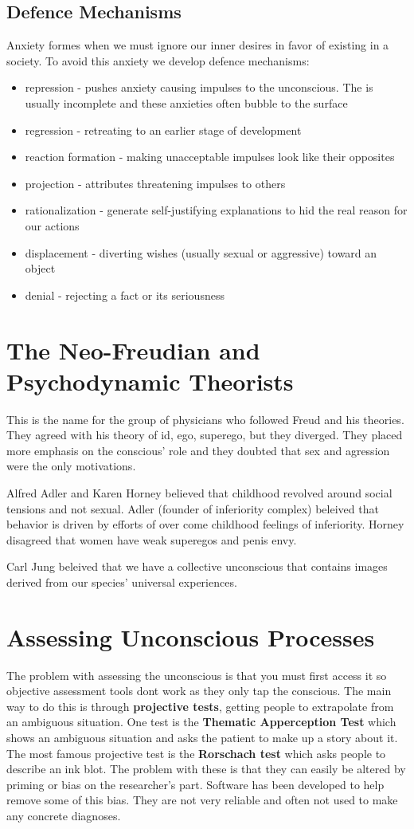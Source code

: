 \documentclass[12pt]{article}
\begin{document}
\subsection*{Defence Mechanisms}
Anxiety formes when we must ignore our inner desires in favor of existing in a society. To avoid this anxiety we develop defence mechanisms:
\begin{itemize}
\item repression - pushes anxiety causing impulses to the unconscious. The is usually incomplete and these anxieties often bubble to the surface
\item regression - retreating to an earlier stage of development 
\item reaction formation - making unacceptable impulses look like their opposites
\item projection - attributes threatening impulses to others
\item rationalization - generate self-justifying explanations to hid the real reason for our actions
\item displacement - diverting wishes (usually sexual or aggressive) toward an object
\item denial - rejecting a fact or its seriousness
\end{itemize}
\section*{The Neo-Freudian and Psychodynamic Theorists}
This is the name for the group of physicians who followed Freud and his theories. They agreed with his theory of id, ego, superego, but they diverged. They placed more emphasis on the conscious' role and they doubted that sex and agression were the only motivations.  

Alfred Adler and Karen Horney believed that childhood revolved around social tensions and not sexual. Adler (founder of inferiority complex) beleived that behavior is driven by efforts of over come childhood feelings of inferiority. Horney disagreed that women have weak superegos and penis envy.

Carl Jung beleived that we have a collective unconscious that contains images derived from our species' universal experiences.

\section*{Assessing Unconscious Processes}
The problem with assessing the unconscious is that you must first access it so objective assessment tools dont work as they only tap the conscious. The main way to do this is through \textbf{projective tests}, getting people to extrapolate from an ambiguous situation. One test is the \textbf{Thematic Apperception Test} which shows an ambiguous situation and asks the patient to make up a story about it. The most famous projective test is the \textbf{Rorschach test} which asks people to describe an ink blot. The problem with these is that they can easily be altered by priming or bias on the researcher's part.  Software has been developed to help remove some of this bias. They are not very reliable and often not used to make any concrete diagnoses. 
\end{document}
